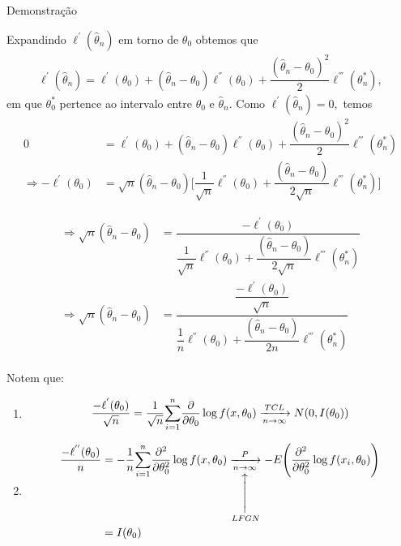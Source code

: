 \documentclass[12pt]{beamer}
\begin{document}
\begin{frame}{Demonstração}
\begin{block}{}
\justifying
Expandindo $\ell^{'}(\hat{\theta}_{n})$ em torno de $\theta_{0}$ obtemos que
\begin{align*}
    \ell^{'}(\hat{\theta}_{n})=\ell^{'}(\theta_{0})+(\hat{\theta}_{n}-\theta_{0})\ell^{''}(\theta_{0})+
    \dfrac{(\hat{\theta}_{n}-\theta_{0})^{2}}{2}\ell^{'''}(\theta_{n}^{*}),
\end{align*}
em que $\theta_{0}^{*}$ pertence ao intervalo entre $\theta_{0}$ e $\hat{\theta}_{n}.$ Como $\ell^{'}(\hat{\theta}_{n})=0,$ temos
\begin{align*}
   0&= \ell^{'}(\theta_{0})+(\hat{\theta}_{n}-\theta_{0})\ell^{''}(\theta_{0})+
    \dfrac{(\hat{\theta}_{n}-\theta_{0})^{2}}{2}\ell^{'''}(\theta_{n}^{*})\\
    \Rightarrow -\ell^{'}(\theta_{0})&=\sqrt{n}(\hat{\theta}_{n}-\theta_{0})\Big[\dfrac{1}{\sqrt{n}}\ell^{''}(\theta_{0})+
    \dfrac{(\hat{\theta}_{n}-\theta_{0})}{2\sqrt{n}}\ell^{'''}(\theta_{n}^{*})\Big]
\end{align*}
\end{block}
\end{frame}

\begin{frame}{}
\begin{block}{}
\justifying
\begin{align*}
   \Rightarrow \sqrt{n}(\hat{\theta}_{n}-\theta_{0})&=\dfrac{-\ell^{'}(\theta_{0})}{\dfrac{1}{\sqrt{n}}\ell^{''}(\theta_{0})+
    \dfrac{(\hat{\theta}_{n}-\theta_{0})}{2\sqrt{n}}\ell^{'''}(\theta_{n}^{*})}\\
    \Rightarrow \sqrt{n}(\hat{\theta}_{n}-\theta_{0})&=\dfrac{\dfrac{-\ell^{'}(\theta_{0})}{\sqrt{n}}}{\dfrac{1}{n}\ell^{''}(\theta_{0})+
    \dfrac{(\hat{\theta}_{n}-\theta_{0})}{2n}\ell^{'''}(\theta_{n}^{*})}\\
\end{align*}
\end{block}
\end{frame}

\begin{frame}{}
\begin{block}{Notem que:}
\justifying
\begin{enumerate}
    \item
\begin{align*}
    \dfrac{-\ell^{'}(\theta_{0})}{\sqrt{n}}=\dfrac{1}{\sqrt{n}}{\displaystyle \sum_{i=1}^{n}}\dfrac{\partial}{\partial\theta_{0}}\log{f(x,\theta_{0})}    \xrightarrow[n\rightarrow\infty]{TCL}N(0,I(\theta_{0}))
\end{align*}
\item
\begin{align*}
    \dfrac{-\ell^{''}(\theta_{0})}{n}&=-\dfrac{1}{n}\Sumi\dfrac{\partial^{2}}{\partial\theta_{0}^{2}}\log{f(x,\theta_{0})}    \SetaUP{LFGN}{\xrightarrow[n\rightarrow\infty]{P}}-E\Bigg(\dfrac{\partial^{2}}{\partial\theta_{0}^{2}}\log{f(x_{i},\theta_{0})}\Bigg)\\
    &=I(\theta_{0})
\end{align*}
\seti
\end{enumerate}
\end{block}
\end{frame}
\end{document}
